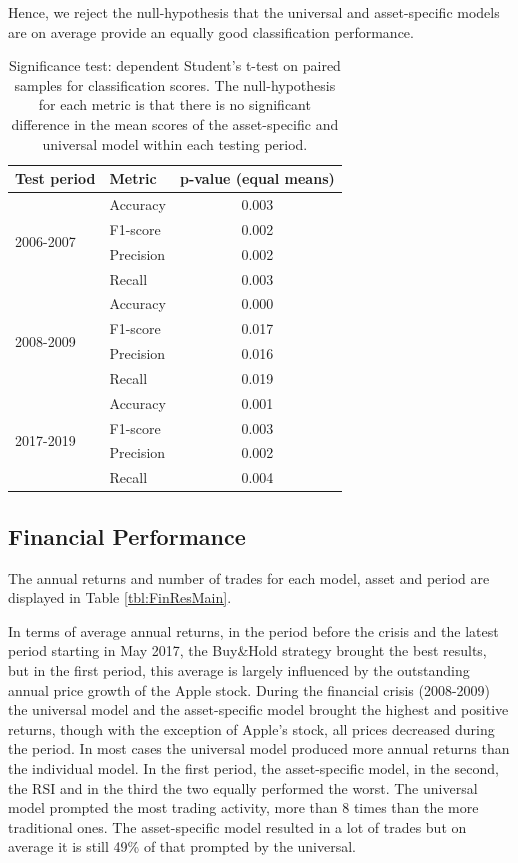 \documentclass[12pt, a4paper]{article}
\begin{document}
Hence, we reject the null-hypothesis that the universal and asset-specific models are on average provide an equally good classification performance.

\begin{table}[H]
\centering
\begin{tabular}{l|l|c}
 Test period & Metric    & \multicolumn{1}{c}{p-value (equal means)} \\ \hline \hline
 \multirow{4}{1cm}{2006-2007}  & Accuracy  & 0.003                  \\
 & F1-score   & 0.002                  \\
 & Precision & 0.002                  \\
 & Recall  & 0.003                  \\ \hline
 \multirow{4}{1cm}{2008-2009} & Accuracy  & 0.000                  \\
 & F1-score   & 0.017                  \\
 & Precision & 0.016                  \\
 & Recall  & 0.019                  \\ \hline
 \multirow{4}{1cm}{2017-2019} & Accuracy  & 0.001                  \\
 & F1-score   & 0.003                  \\
 & Precision & 0.002                  \\
 & Recall  & 0.004                 
\end{tabular}
\caption{Significance test: dependent Student's t-test on paired samples for classification scores. The null-hypothesis for each metric is that there is no significant difference in the mean scores of the asset-specific and universal model within each testing period.}
\label{tbl:ClassSign}
\end{table}

\subsection{Financial Performance}
\label{subsec:ER:FinPerf}

The annual returns and number of trades for each model, asset and period are displayed in Table \ref{tbl:FinResMain}. 

In terms of average annual returns, in the period before the crisis and the latest period starting in May 2017, the Buy\&Hold strategy brought the best results, but in the first period, this average is largely influenced by the outstanding annual price growth of the Apple stock. During the financial crisis (2008-2009) the universal model and the asset-specific model brought the highest and positive returns, though with the exception of Apple's stock, all prices decreased during the period. In most cases the universal model produced more annual returns than the individual model. In the first period, the asset-specific model, in the second, the RSI and in the third the two equally performed the worst. The universal model prompted the most trading activity, more than 8 times than the more traditional ones. The asset-specific model resulted in a lot of trades but on average it is still  49\% of that prompted by the universal. 
\end{document}
